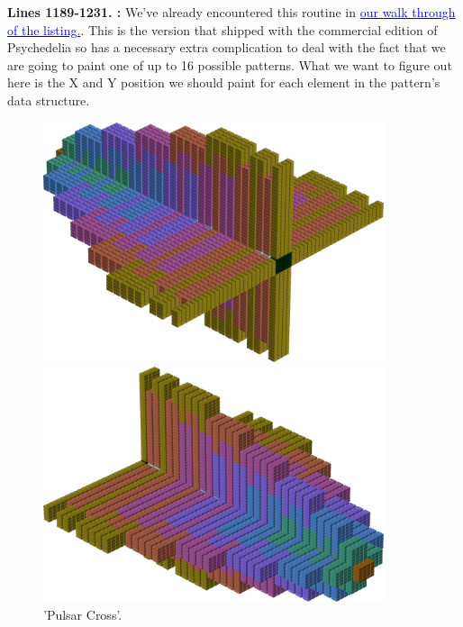 \textbf{Lines 1189-1231. :} We've already encountered this routine
in \hyperref[sec:listing_commentary]{\textcolor{blue}{ our walk through of the listing.}}. This is the version that shipped 
with the commercial edition of Psychedelia so has a necessary extra complication to deal with the fact that we 
are going to paint one of up to 16 possible patterns. What we want to figure out here is the X and Y position we should
paint for each element in the pattern's data structure.
\clearpage

\begin{figure}[H]
    \centering
    \begin{adjustbox}{width=10cm,center}
      \includegraphics[width=10cm]{src/colorspace_patterns/pattern4-45.png}%
    \end{adjustbox}
    \begin{adjustbox}{width=10cm}
      \includegraphics[width=10cm]{src/colorspace_patterns/pattern4-225.png}%
    \end{adjustbox}
\caption{'Pulsar Cross'.}
\end{figure}
\clearpage

